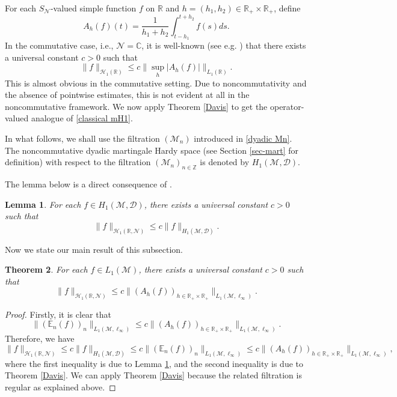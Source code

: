 \documentclass[11]{amsart}
\numberwithin{equation}{section}
\newtheorem{theorem}{Theorem}[section]
\newtheorem{lemma}[theorem]{Lemma}
\newcommand{\R}{\mathbb{R}}
\begin{document}
For   each $S_{\mathcal{N}}$-valued simple function $f$ on $\mathbb{R}$ and $h=(h_1,h_2)\in \R_+\times \R_+$, define 
$$A_h(f)(t)=\frac{1}{h_1+h_2}\int_{t-h_1}^{t+h_2}f(s)ds.$$
In the commutative case, i.e., $\mathcal{N}=\mathbb{C}$, it is well-known (see e.g. \cite[p.\,39]{Gr2009}) that  there exists a universal  constant $c>0$ such that
\begin{equation}\label{classical mH1}
	\|f\|_{\mathcal{H}_1(\mathbb{R})}\leq c\|\sup_{h}|A_{h}(f)|\|_{L_1(\mathbb{R})}.
\end{equation}
This is almost obvious in the commutative setting. Due to noncommutativity and the absence of pointwise estimates, this is not evident at all in the noncommutative framework. We now apply Theorem \ref{Davis} to get the operator-valued analogue of \eqref{classical mH1}.


In what follows, we shall use the filtration  $(\mathcal{M}_n)$ introduced in \eqref{dyadic Mn}. The noncommutative dyadic martingale Hardy space (see Section \ref{sec-mart} for definition) with respect to the filtration $(\mathcal{M}_n)_{n\in\mathbb{Z}}$ is denoted by $H_1(\mathcal{M},\mathcal{D})$. 


The lemma below is a direct consequence of \cite[Corollary 5.3]{Me2007}. 
\begin{lemma}\label{lem Mei}
	For each $f\in H_1(\mathcal{M}, \mathcal{D})$, there exists a universal constant $c>0$ such that 
	$$\|f\|_{\mathcal{H}_1(\mathbb{R},\mathcal{N})}\leq c \|f\|_{H_1(\mathcal{M}, \mathcal{D})}. $$
\end{lemma}


Now we state our main result of this subsection.
\begin{theorem}\label{Mei-H1}
	For each $f\in L_1(\mathcal{M})$, there exists a universal constant $c>0$ such that 
	$$\|f\|_{\mathcal{H}_1(\mathbb{R},\mathcal{N})}\leq c\|(A_h(f))_{h\in \mathbb{R}_+\times \mathbb{R}_+}\|_{L_1(\mathcal{M},\ell_{\infty})}.$$
\end{theorem}
\begin{proof}
	Firstly, it is clear that 
	$$\|(\mathbb{E}_n(f))_n\|_{L_1(\mathcal{M},\ell_{\infty})}\leq c\|(A_h(f))_{h\in \mathbb{R}_+\times \mathbb{R}_+}\|_{L_1(\mathcal{M},\ell_{\infty})}.$$
	Therefore, we have
	$$\|f\|_{\mathcal{H}_1(\mathbb{R},\mathcal{N})}\leq c\|f\|_{H_1(\mathcal{M}, \mathcal{D})}\leq c\|(\mathbb{E}_n(f))_n\|_{L_1(\mathcal{M},\ell_{\infty})}\leq c\|(A_h(f))_{h\in \mathbb{R}_+\times \mathbb{R}_+}\|_{L_1(\mathcal{M},\ell_{\infty})},$$
	where the first inequality is due to Lemma \ref{lem Mei}, and the second inequality is due to Theorem \ref{Davis}. We can apply Theorem \ref{Davis} because the related filtration is regular as explained above. 
\end{proof}
\end{document}
